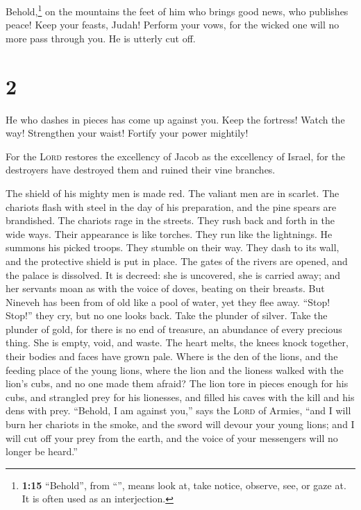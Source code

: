  Behold,\footnote{\textbf{1:15} ``Behold'', from
  ``'', means look at, take notice, observe, see, or gaze
  at. It is often used as an interjection.} on the mountains the feet of
him who brings good news, who publishes peace! Keep your feasts, Judah!
Perform your vows, for the wicked one will no more pass through you. He
is utterly cut off.

\hypertarget{section-1}{%
\section{2}\label{section-1}}

 He who dashes in pieces has come up against you. Keep the
fortress! Watch the way! Strengthen your waist! Fortify your power
mightily!

 For the \textsc{Lord} restores the excellency of Jacob as
the excellency of Israel, for the destroyers have destroyed them and
ruined their vine branches.

 The shield of his mighty men is made red. The valiant men
are in scarlet. The chariots flash with steel in the day of his
preparation, and the pine spears are brandished.  The
chariots rage in the streets. They rush back and forth in the wide ways.
Their appearance is like torches. They run like the lightnings.
 He summons his picked troops. They stumble on their way.
They dash to its wall, and the protective shield is put in place.
 The gates of the rivers are opened, and the palace is
dissolved.  It is decreed: she is uncovered, she is
carried away; and her servants moan as with the voice of doves, beating
on their breasts.  But Nineveh has been from of old like a
pool of water, yet they flee away. ``Stop! Stop!'' they cry, but no one
looks back.  Take the plunder of silver. Take the plunder
of gold, for there is no end of treasure, an abundance of every precious
thing.  She is empty, void, and waste. The heart melts,
the knees knock together, their bodies and faces have grown pale.
 Where is the den of the lions, and the feeding place of
the young lions, where the lion and the lioness walked with the lion's
cubs, and no one made them afraid?  The lion tore in
pieces enough for his cubs, and strangled prey for his lionesses, and
filled his caves with the kill and his dens with prey. 
``Behold, I am against you,'' says the \textsc{Lord} of Armies, ``and I
will burn her chariots in the smoke, and the sword will devour your
young lions; and I will cut off your prey from the earth, and the voice
of your messengers will no longer be heard.''

